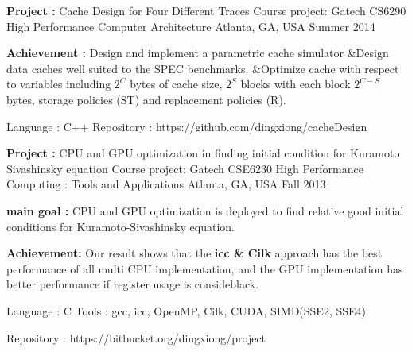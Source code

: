 \begin{cventries}
\cventry
{\textbf{Project :} Cache Design for Four Different Traces} 
{Course project: Gatech CS6290 High Performance Computer Architecture} 
{Atlanta, GA, USA} %
{Summer 2014} %
{
  \begin{cvitems}
  \item {\textbf{Achievement :} Design and implement a parametric cache
      simulator \quad\&\quad Design data caches well suited to the SPEC benchmarks. 
      \quad\&\quad Optimize cache with respect to variables
      including $2^C$ bytes of cache size, $2^S$ blocks with each block $2^{C-S}$ bytes,
      storage policies (ST) and replacement policies (R).
    }
  \item {Language : C++  \quad
      Repository : {\color{black} https://github.com/dingxiong/cacheDesign}
    }
  \end{cvitems}
}

\cventry
{\textbf{Project :} CPU and GPU optimization in finding initial 
  condition for Kuramoto Sivashinsky equation} 
{Course project: Gatech CSE6230 High Performance Computing : Tools and Applications} 
{Atlanta, GA, USA} %
{Fall 2013} %
{
  \begin{cvitems}
  \item {\textbf{main goal :} CPU and GPU optimization is deployed to find relative 
      good initial conditions for Kuramoto-Sivashinsky equation. 
    }
    \item {\textbf{Achievement: }Our result shows that the 
      \textbf{icc \& Cilk} approach has the best performance of all multi CPU implementation, and
      the GPU implementation has better performance if register usage is consideblack.
    }
  \item {Language : C \quad 
      Tools :  gcc, icc, OpenMP, Cilk, CUDA, SIMD(SSE2, SSE4)
    }
  \item {
      Repository : {\color{black} https://bitbucket.org/dingxiong/project}
    }
  \end{cvitems}
}







\end{cventries}